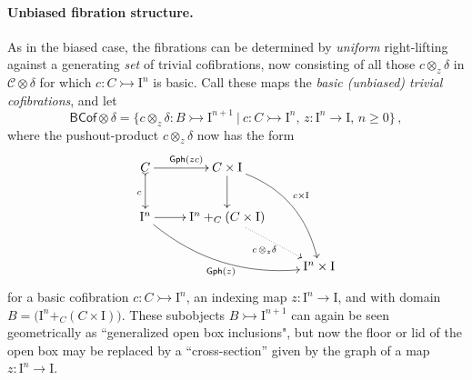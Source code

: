 \documentclass[12pt]{article}
\newcommand{\mono}{\ensuremath{\rightarrowtail}}
\newcommand{\ra}{\ensuremath{\rightarrow}}
\newcommand{\I}{\ensuremath{\mathrm{I}}}
\theoremstyle{remark}
\theoremstyle{definition}
\begin{document}
\paragraph{Unbiased fibration structure.}\label{sec:unbiasedfibration}

As in the biased case, the fibrations can  be determined by \emph{uniform} right-lifting against a generating \emph{set} of trivial cofibrations, now consisting of all those $c \otimes_z \delta$ in $\mathcal{C}\otimes \delta$ for which $c : C \mono \I^n$ is basic.  Call these maps the \emph{basic (unbiased) trivial cofibrations}, and let 
\begin{equation}\label{eq:basicunbiasedTCof}
\mathsf{BCof}\otimes \delta = \{c \otimes_z \delta : B \mono \I^{n+1}\ |\ c : C\mono \I^n,\, z : \I^n \ra \I,\,n\geq 0\}\,,
\end{equation}
where the pushout-product $c\otimes_z \delta$ now has the form
\begin{equation}\label{diagram:unbiasedbasicpushoutproduct}
\xymatrix{
C \ar@{>->}[d]_{c} \ar[r]^{\mathsf{Gph}(zc)} & C\times \I \ar[d] \ar@/^4ex/ [rdd]^{c\times\I}\\
\I^n \ar@/_4ex/ [rrd]_{\mathsf{Gph}(z)} \ar[r] &  \I^n +_C (C\times\I) \ar@{.>}[rd]_{c\, \otimes_z \delta} \\
&& \I^n\times\I
}
\end{equation}
for a basic cofibration $c : C\mono \I^n$, an indexing map $z : \I^n \ra \I$, and with domain $B = \big(\I^n +_C (C\times\I)\big)$.   These subobjects $B \mono \I^{n+1}$ can again be seen geometrically as ``generalized open box inclusions", but now the floor or lid of the open box may be replaced by a ``cross-section'' given by the graph of a map $z:\I^n\ra \I$.
\end{document}
